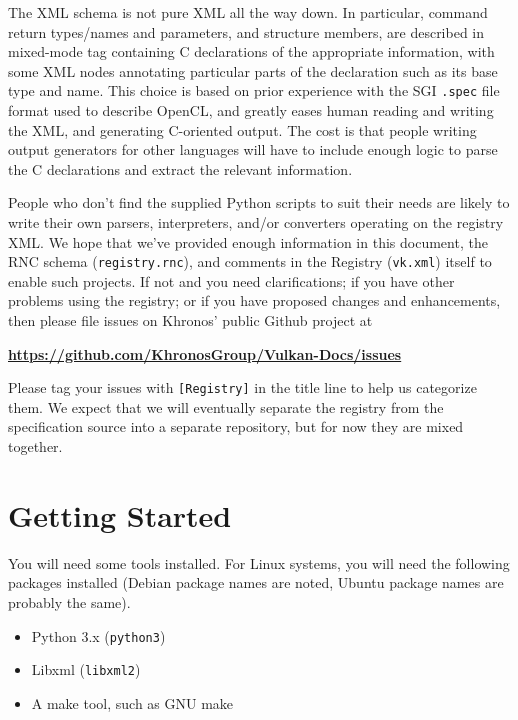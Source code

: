 \documentclass{article}
\def\code#1{{\tt #1}}
\begin{document}
The XML schema is not pure XML all the way down. In particular, command
return types/names and parameters, and structure members, are described in
mixed-mode tag containing C declarations of the appropriate information,
with some XML nodes annotating particular parts of the declaration such as
its base type and name. This choice is based on prior experience with the
SGI {\tt .spec} file format used to describe OpenCL, and greatly eases human
reading and writing the XML, and generating C-oriented output. The cost is
that people writing output generators for other languages will have to
include enough logic to parse the C declarations and extract the relevant
information.

People who don't find the supplied Python scripts to suit their needs are
likely to write their own parsers, interpreters, and/or converters operating
on the registry XML. We hope that we've provided enough information in this
document, the RNC schema ({\tt registry.rnc}), and comments in the Registry
({\tt vk.xml}) itself to enable such projects. If not and you need
clarifications; if you have other problems using the registry; or if you
have proposed changes and enhancements, then please file issues on Khronos'
public Github project at

\begin{center}
{\bf \href{https://github.com/KhronosGroup/Vulkan-Docs/issues}
          {https://github.com/KhronosGroup/Vulkan-Docs/issues}}
\end{center}

Please tag your issues with {\tt [Registry]} in the title line to help us
categorize them. We expect that we will eventually separate the registry
from the specification source into a separate repository, but for now they
are mixed together.


\section{Getting Started}
\label{starting}

You will need some tools installed.
For Linux systems, you will need the following packages installed (Debian
package names are noted, Ubuntu package names are probably the same).

\begin{itemize}
\item Python 3.x (\code{python3})
\item Libxml (\code{libxml2})
\item A make tool, such as GNU make
\end{itemize}
\end{document}
